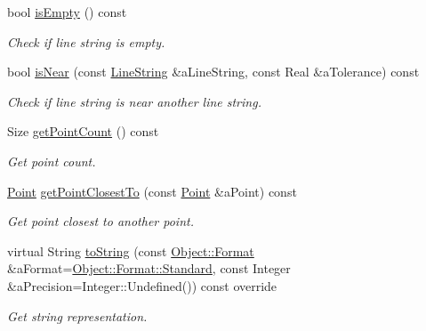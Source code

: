 \begin{DoxyCompactItemize}
bool \hyperlink{classlibrary_1_1math_1_1geom_1_1d2_1_1objects_1_1_line_string_a4cdb4e69cd076285cb14356b86b41fcf}{is\+Empty} () const
\begin{DoxyCompactList}\small\item\em Check if line string is empty. \end{DoxyCompactList}\item 
bool \hyperlink{classlibrary_1_1math_1_1geom_1_1d2_1_1objects_1_1_line_string_a306598a5dca56802f094c57465a4d551}{is\+Near} (const \hyperlink{classlibrary_1_1math_1_1geom_1_1d2_1_1objects_1_1_line_string}{Line\+String} \&a\+Line\+String, const Real \&a\+Tolerance) const
\begin{DoxyCompactList}\small\item\em Check if line string is near another line string. \end{DoxyCompactList}\item 
Size \hyperlink{classlibrary_1_1math_1_1geom_1_1d2_1_1objects_1_1_line_string_a950ceda32b44a6f2e49c1e36bc4f4dc2}{get\+Point\+Count} () const
\begin{DoxyCompactList}\small\item\em Get point count. \end{DoxyCompactList}\item 
\hyperlink{classlibrary_1_1math_1_1geom_1_1d2_1_1objects_1_1_point}{Point} \hyperlink{classlibrary_1_1math_1_1geom_1_1d2_1_1objects_1_1_line_string_a038dba8bffbcaaf498a349341458db4a}{get\+Point\+Closest\+To} (const \hyperlink{classlibrary_1_1math_1_1geom_1_1d2_1_1objects_1_1_point}{Point} \&a\+Point) const
\begin{DoxyCompactList}\small\item\em Get point closest to another point. \end{DoxyCompactList}\item 
virtual String \hyperlink{classlibrary_1_1math_1_1geom_1_1d2_1_1objects_1_1_line_string_a13c0a7c5b8da7724b5a2dd2933064768}{to\+String} (const \hyperlink{classlibrary_1_1math_1_1geom_1_1d2_1_1_object_ac8cd61dada4960cfee9a469231621b17}{Object\+::\+Format} \&a\+Format=\hyperlink{classlibrary_1_1math_1_1geom_1_1d2_1_1_object_ac8cd61dada4960cfee9a469231621b17aeb6d8ae6f20283755b339c0dc273988b}{Object\+::\+Format\+::\+Standard}, const Integer \&a\+Precision=Integer\+::\+Undefined()) const override
\begin{DoxyCompactList}\small\item\em Get string representation. \end{DoxyCompactList}\item 

\end{DoxyCompactItemize}

